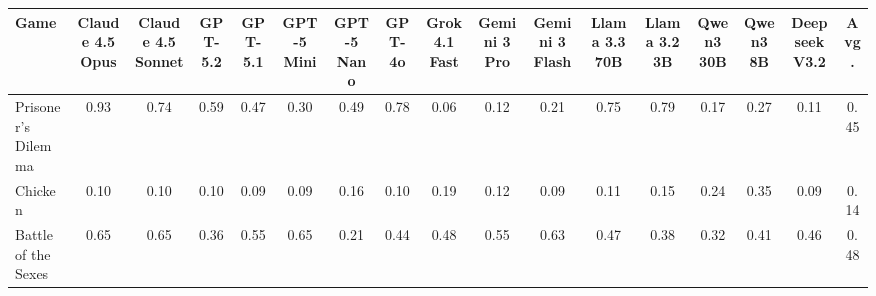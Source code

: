 
\begin{table}[htbp]
\centering
\renewcommand{\arraystretch}{2}
\footnotesize
\begin{adjustbox}{max width=\textwidth}
\begin{tabular}{lccccccccccccccc|c}
\toprule
\textbf{Game} & \textbf{\scriptsize Claude 4.5 Opus} & \textbf{\scriptsize Claude 4.5 Sonnet} & \textbf{\scriptsize GPT-5.2} & \textbf{\scriptsize GPT-5.1} & \textbf{\scriptsize GPT-5 Mini} & \textbf{\scriptsize GPT-5 Nano} & \textbf{\scriptsize GPT-4o} & \textbf{\scriptsize Grok 4.1 Fast} & \textbf{\scriptsize Gemini 3 Pro} & \textbf{\scriptsize Gemini 3 Flash} & \textbf{\scriptsize Llama 3.3 70B} & \textbf{\scriptsize Llama 3.2 3B} & \textbf{\scriptsize Qwen3 30B} & \textbf{\scriptsize Qwen3 8B} & \textbf{\scriptsize Deepseek V3.2} & \textbf{\scriptsize Avg.} \\
\midrule
Prisoner's Dilemma & \cellcolor[HTML]{38A55E}0.93 & \cellcolor[HTML]{93CE8A}0.74 & \cellcolor[HTML]{D6ECAB}0.59 & \cellcolor[HTML]{FCF4B7}0.47 & \cellcolor[HTML]{EEAB81}0.30 & \cellcolor[HTML]{FDF9BA}0.49 & \cellcolor[HTML]{7DC480}0.78 & \cellcolor[HTML]{DB4939}0.06 & \cellcolor[HTML]{E0604A}0.12 & \cellcolor[HTML]{E78666}0.21 & \cellcolor[HTML]{8DCC88}0.75 & \cellcolor[HTML]{7AC37E}0.79 & \cellcolor[HTML]{E4775B}0.17 & \cellcolor[HTML]{ECA17A}0.27 & \cellcolor[HTML]{E05E49}0.11 & \cellcolor[HTML]{FBEBB0}0.45 \\
Chicken & \cellcolor[HTML]{DE5844}0.10 & \cellcolor[HTML]{DF5A46}0.10 & \cellcolor[HTML]{DE5744}0.10 & \cellcolor[HTML]{DE5643}0.09 & \cellcolor[HTML]{DE5743}0.09 & \cellcolor[HTML]{E37156}0.16 & \cellcolor[HTML]{DE5844}0.10 & \cellcolor[HTML]{E68062}0.19 & \cellcolor[HTML]{E0604A}0.12 & \cellcolor[HTML]{DE5643}0.09 & \cellcolor[HTML]{DF5C47}0.11 & \cellcolor[HTML]{E26D54}0.15 & \cellcolor[HTML]{EA9370}0.24 & \cellcolor[HTML]{F3C191}0.35 & \cellcolor[HTML]{DE5643}0.09 & \cellcolor[HTML]{E26951}0.14 \\
Battle of the Sexes & \cellcolor[HTML]{BADF9D}0.65 & \cellcolor[HTML]{BAE09D}0.65 & \cellcolor[HTML]{F4C695}0.36 & \cellcolor[HTML]{E7F4B3}0.55 & \cellcolor[HTML]{B9DF9D}0.65 & \cellcolor[HTML]{E88868}0.21 & \cellcolor[HTML]{FAE6AD}0.44 & \cellcolor[HTML]{FDF6B8}0.48 & \cellcolor[HTML]{E6F4B3}0.55 & \cellcolor[HTML]{C1E3A1}0.63 & \cellcolor[HTML]{FCF2B6}0.47 & \cellcolor[HTML]{F5CC99}0.38 & \cellcolor[HTML]{F0B589}0.32 & \cellcolor[HTML]{F7DAA3}0.41 & \cellcolor[HTML]{FBEDB2}0.46 & \cellcolor[HTML]{FDF7B9}0.48 \\

\end{tabular}
\end{adjustbox}
\end{table}

